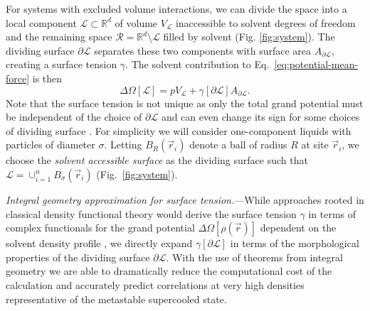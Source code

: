 \documentclass[11pt,twoside]{report}
\begin{document}
For systems with excluded volume interactions, we can divide the space into a local component $\mathcal{L} \subset \mathbb{R}^d$ of volume $V_\mathcal{L}$ inaccessible to solvent degrees of freedom and the remaining space $\mathcal{R} = \mathbb{R}^d \setminus \mathcal{L}$ filled by solvent (Fig. \ref{fig:system}).
The dividing surface $\partial\mathcal{L}$ separates these two components with surface area $A_{\partial\mathcal{L}}$, creating a surface tension $\gamma$.
The solvent contribution to Eq.\ \eqref{eq:potential-mean-force} is then \begin{equation}\label{eq:surface-tension}
  \Delta \Omega[\mathcal{L}] =
  p V_\mathcal{L} + \gamma[{\partial\mathcal{L}}] A_{\partial\mathcal{L}}.
\end{equation}
Note that the surface tension is not unique as only the total grand potential must be independent of the choice of $\partial\mathcal{L}$ and can even change its sign for some choices of dividing surface \cite{Bryk2003}.
For simplicity we will consider one-component liquids with particles of diameter $\sigma$.
Letting $B_R(\vec{r}_i)$ denote a ball of radius $R$ at site $\vec{r}_i$, we choose the \emph{solvent accessible surface} \cite{Lee1971} as the dividing surface such that $\mathcal{L} = \cup_{i=1}^n B_\sigma(\vec{r}_i)$ (Fig.\ \ref{fig:system}).

\emph{Integral geometry approximation for surface tension.}---While approaches rooted in classical density functional theory \cite{Evans1992} would derive the surface tension $\gamma$ in terms of complex functionals for the grand potential $\Delta\Omega[\rho(\vec{r})]$ dependent on the solvent density profile \cite{Rosenfeld1989,Roth2010}, we directly expand $\gamma[\partial\mathcal{L}]$ in terms of the morphological properties of the dividing surface $\partial\mathcal{L}$.
With the use of theorems from integral geometry \cite{Hadwiger1957} we are able to dramatically reduce the computational cost of the calculation and accurately predict correlations at very high densities representative of the metastable supercooled state.
\end{document}
